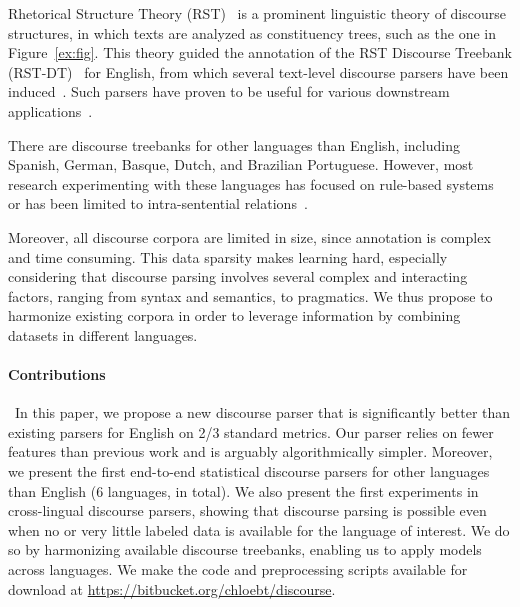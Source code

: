 \documentclass[11pt]{article}
\begin{document}
Rhetorical Structure Theory (RST)~\cite{mann:rhetorical:1988} is a prominent linguistic theory of discourse structures, in which texts are analyzed as constituency trees, such as the one in Figure~\ref{ex:fig}. This theory guided the annotation of the RST Discourse Treebank (RST-DT)~\cite{carlson:building:2001} for English, from which several text-level discourse parsers have been induced~\cite{duverle:hilda:2010,joty:novel:2012,feng:linear:2014,li:recursive:2014,ji:representation:2014}. 
Such parsers have proven to be useful for various downstream applications~\cite{daume:noisy:2002,burstein:finding:2003,higgins:evaluationg:2004,thione:hybrid:2004,sporleder:discourse:2005,taboada:applications:2006,louis:discourse:2010,bhatia:better:2015}. 

There are discourse treebanks for other languages than English, including Spanish, German, Basque, Dutch, and Brazilian Portuguese. However, most research experimenting with these languages has focused on rule-based systems~\cite{pardo:development:2008,maziero:dizer:2011} or has been limited to intra-sentential relations~\cite{maziero:adaptation:2015}.

Moreover, all discourse corpora are limited in size, since annotation is complex and time consuming. 
This data sparsity makes learning hard, especially considering that discourse parsing involves several complex and interacting factors, ranging from syntax and semantics, to pragmatics.
We thus propose to harmonize existing corpora in order to leverage information by combining datasets in different languages.

\paragraph{Contributions} In this paper, we propose a new discourse parser that is significantly better than existing parsers for English on 2/3 standard metrics. Our parser relies on fewer features than previous work and is arguably algorithmically simpler. Moreover, we present the first end-to-end statistical discourse parsers for other languages than English (6 languages, in total). We also present the first experiments in cross-lingual discourse parsers, showing that discourse parsing is possible even when no or very little labeled data is available for the language of interest. We do so by harmonizing available discourse treebanks, enabling us to apply models across languages. 
We make the code and preprocessing scripts available for download at \url{https://bitbucket.org/chloebt/discourse}.
\end{document}
